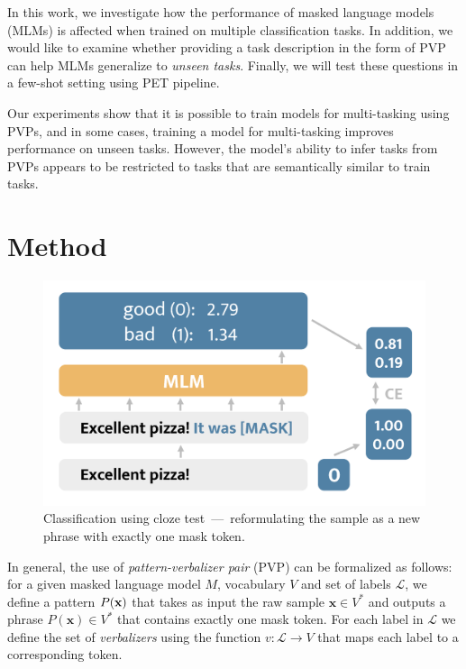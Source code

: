 \documentclass[11pt,a4paper]{article}
\begin{document}
In this work, we investigate how the performance of masked language models (MLMs) is affected when trained on multiple classification tasks.
In addition, we would like to examine whether providing a task description in the form of PVP can help MLMs generalize to \textit{unseen tasks}.
Finally, we will test these questions in a few-shot setting using PET pipeline.

Our experiments show that it is possible to train models for multi-tasking using PVPs,
and in some cases, training a model for multi-tasking improves performance on unseen tasks.
However, the model's ability to infer tasks from PVPs appears to be restricted to tasks that are semantically similar to train tasks.

\section{Method}
\label{sec:method}

\begin{figure}[h]
	\centering
	\includegraphics[width=\linewidth]{mlm_classification}
	\caption{Classification using cloze test~---~reformulating the sample as a new phrase with exactly one mask token.}
	\label{fig:method}
\vspace{-10pt}
\end{figure}

In general, the use of \textit{pattern-verbalizer pair} (PVP) can be formalized as follows: for a given masked language model $M$, vocabulary $V$ and set of labels $\mathcal{L}$, we define a pattern $P(\textbf{\text{x}})$ that takes as input the raw sample $\textbf{x}\in{}V^*$ and outputs a phrase $P(\textbf{x})\in{}V^*$ that contains exactly one mask token.
For each label in $\mathcal{L}$ we define the set of \textit{verbalizers} using the function $v:\mathcal{L}\rightarrow{}V$ that maps each label to a corresponding token.
\end{document}
